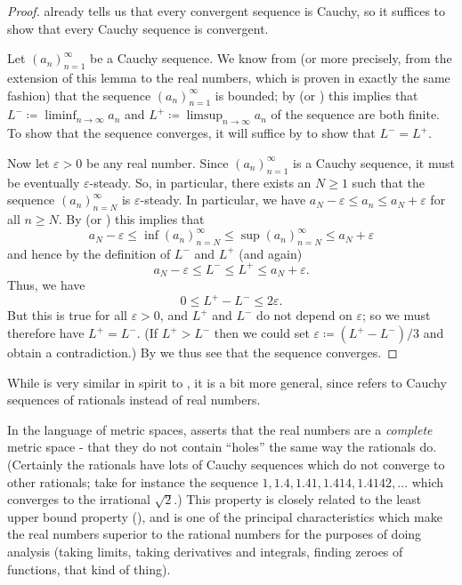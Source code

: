 \begin{proof}
   already tells us that every convergent sequence is Cauchy, so it suffices to show that every Cauchy sequence is convergent.

  Let \((a_n)_{n = 1}^\infty\) be a Cauchy sequence.
  We know from  (or more precisely, from the extension of this lemma to the real numbers, which is proven in exactly the same fashion) that the sequence \((a_n)_{n = 1}^\infty\) is bounded;
  by  (or ) this implies that \(L^- \coloneqq \liminf_{n \to \infty} a_n\) and \(L^+ \coloneqq \limsup_{n \to \infty} a_n\) of the sequence are both finite.
  To show that the sequence converges, it will suffice by  to show that \(L^- = L^+\).

  Now let \(\varepsilon > 0\) be any real number.
  Since \((a_n)_{n = 1}^\infty\) is a Cauchy sequence, it must be eventually \(\varepsilon\)-steady.
  So, in particular, there exists an \(N \geq 1\) such that the sequence \((a_n)_{n = N}^\infty\) is \(\varepsilon\)-steady.
  In particular, we have \(a_N - \varepsilon \leq a_n \leq a_N + \varepsilon\) for all \(n \geq N\).
  By  (or ) this implies that
  \[
    a_N - \varepsilon \leq \inf(a_n)_{n = N}^\infty \leq \sup(a_n)_{n = N}^\infty \leq a_N + \varepsilon
  \]
  and hence by the definition of \(L^-\) and \(L^+\) (and  again)
  \[
    a_N - \varepsilon \leq L^- \leq L^+ \leq a_N + \varepsilon.
  \]
  Thus, we have
  \[
    0 \leq L^+ - L^- \leq 2\varepsilon.
  \]
  But this is true for all \(\varepsilon > 0\), and \(L^+\) and \(L^-\) do not depend on \(\varepsilon\);
  so we must therefore have \(L^+ = L^-\).
  (If \(L^+ > L^-\) then we could set \(\varepsilon \coloneqq (L^+ - L^-) / 3\) and obtain a contradiction.)
  By  we thus see that the sequence converges.
\end{proof}

\begin{rmk}\label{i:6.4.19}
  While  is very similar in spirit to , it is a bit more general, since  refers to Cauchy sequences of rationals instead of real numbers.
\end{rmk}

\begin{rmk}\label{i:6.4.20}
  In the language of metric spaces,  asserts that the real numbers are a \emph{complete} metric space
  - that they do not contain ``holes'' the same way the rationals do.
  (Certainly the rationals have lots of Cauchy sequences which do not converge to other rationals;
  take for instance the sequence \(1, 1.4, 1.41, 1.414, 1.4142, \dots\) which converges to the irrational \(\sqrt{2}\).)
  This property is closely related to the least upper bound property (), and is one of the principal characteristics which make the real numbers superior to the rational numbers for the purposes of doing analysis
  (taking limits, taking derivatives and integrals, finding zeroes of functions, that kind of thing).
\end{rmk}

